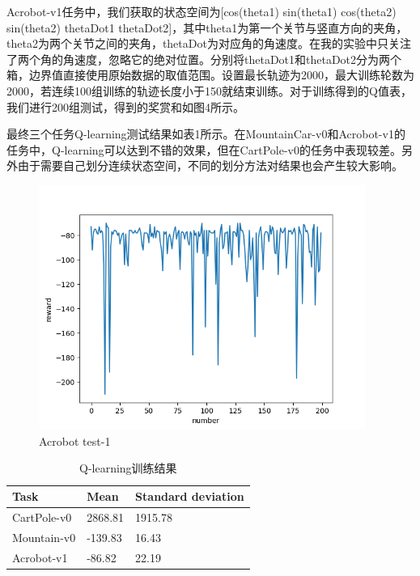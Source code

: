 \documentclass[a4paper,UTF8]{article}
\theoremstyle{definition}
\begin{document}
	Acrobot-v1任务中，我们获取的状态空间为[cos(theta1) sin(theta1) cos(theta2) sin(theta2) thetaDot1 thetaDot2]，其中theta1为第一个关节与竖直方向的夹角，theta2为两个关节之间的夹角，thetaDot为对应角的角速度。在我的实验中只关注了两个角的角速度，忽略它的绝对位置。分别将thetaDot1和thetaDot2分为两个箱，边界值直接使用原始数据的取值范围。设置最长轨迹为2000，最大训练轮数为2000，若连续100组训练的轨迹长度小于150就结束训练。对于训练得到的Q值表，我们进行200组测试，得到的奖赏和如图4所示。

	最终三个任务Q-learning测试结果如表1所示。在MountainCar-v0和Acrobot-v1的任务中，Q-learning可以达到不错的效果，但在CartPole-v0的任务中表现较差。另外由于需要自己划分连续状态空间，不同的划分方法对结果也会产生较大影响。
\begin{figure}[!h]
\centering
\small
\includegraphics[height=8cm]{Acrobot-v1.png}
\caption{Acrobot test-1}
\end{figure}

	



\begin{table}[!h]
\caption{Q-learning训练结果}  
\centering
\begin{tabular*}{8cm}{lll}  
\hline  
Task & Mean 
 &  Standard deviation\\  
\hline  
CartPole-v0  & 2868.81 & 1915.78 \\  
Mountain-v0  & -139.83 & 16.43 \\ 
Acrobot-v1 	 & -86.82  & 22.19 \\ 
\hline  
\end{tabular*}  
\end{table} 
\end{document}
